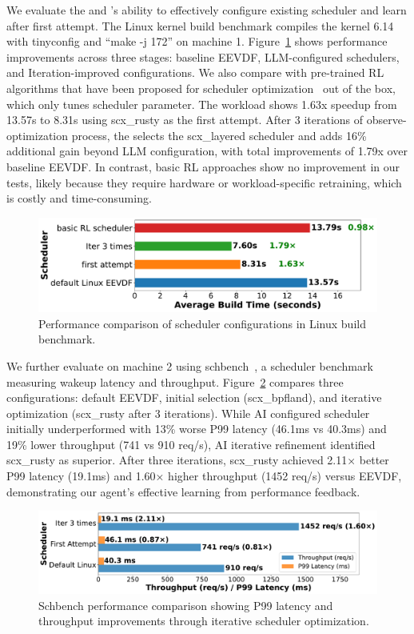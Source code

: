 We evaluate the \sys and \agent's ability to effectively configure existing scheduler and learn after first attempt. The Linux kernel build benchmark compiles the kernel 6.14 with tinyconfig and ``make -j 172'' on machine 1. Figure~\ref{fig:performance-comparison} shows performance improvements across three stages: baseline EEVDF, LLM-configured schedulers, and Iteration-improved configurations. We also compare with pre-trained RL algorithms that have been proposed for scheduler optimization~\cite{corbet2025ml} out of the box, which only tunes scheduler parameter. The workload shows 1.63x speedup from 13.57s to 8.31s using scx\_rusty as the first attempt. After 3 iterations of observe-optimization process, the \agent selects the scx\_layered scheduler and adds 16\% additional gain beyond LLM configuration, with total improvements of 1.79x over baseline EEVDF. In contrast, basic RL approaches show no improvement in our tests, likely because they require hardware or workload-specific retraining, which is costly and time-consuming.

\begin{figure}[h]
\centering
\includegraphics[width=0.9\columnwidth]{sections/Linux_build_benchmark_results.pdf}
\caption{Performance comparison of scheduler configurations in Linux build benchmark.}
\label{fig:performance-comparison}
\end{figure}

We further evaluate \sys on machine 2 using schbench~\cite{schbench2016}, a scheduler benchmark measuring wakeup latency and throughput. Figure~\ref{fig:schbench-comparison} compares three configurations: default EEVDF, initial selection (scx\_bpfland), and iterative optimization (scx\_rusty after 3 iterations). While AI configured scheduler initially underperformed with 13\% worse P99 latency (46.1ms vs 40.3ms) and 19\% lower throughput (741 vs 910 req/s), AI iterative refinement identified scx\_rusty as superior. After three iterations, scx\_rusty achieved 2.11× better P99 latency (19.1ms) and 1.60× higher throughput (1452 req/s) versus EEVDF, demonstrating our agent's effective learning from performance feedback.

\begin{figure}[h]
\centering
\includegraphics[width=0.9\columnwidth]{sections/schbench_performance_comparison.pdf}
\caption{Schbench performance comparison showing P99 latency and throughput improvements through iterative scheduler optimization.}
\label{fig:schbench-comparison}
\end{figure}

